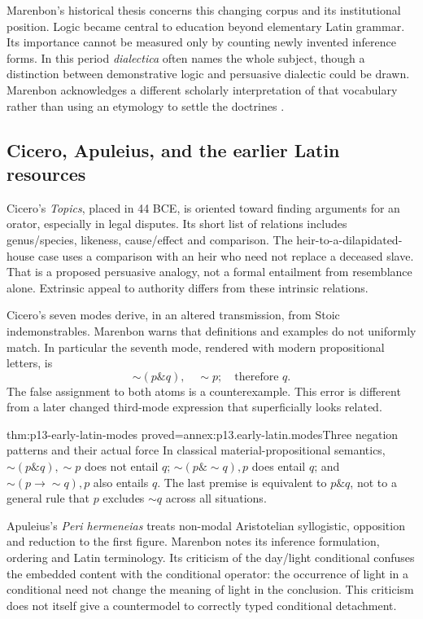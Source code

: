 Marenbon's historical thesis concerns this changing corpus and its
institutional position. Logic became central to education beyond
elementary Latin grammar. Its importance cannot be measured only
by counting newly invented inference forms. In this period
\emph{dialectica} often names the whole subject, though a distinction
between demonstrative logic and persuasive dialectic could be drawn.
Marenbon acknowledges a different scholarly interpretation of that
vocabulary rather than using an etymology to settle the doctrines
\cite[pp.~1--3]{Marenbon2007FordhamEarlyLatin}.

\subsection{Cicero, Apuleius, and the earlier Latin resources}

Cicero's \emph{Topics}, placed in 44 BCE, is oriented toward finding
arguments for an orator, especially in legal disputes. Its short list
of relations includes genus/species, likeness, cause/effect and comparison.
The heir-to-a-dilapidated-house case uses a comparison with an heir
who need not replace a deceased slave. That is a proposed persuasive
analogy, not a formal entailment from resemblance alone.
Extrinsic appeal to authority differs from these intrinsic relations.

Cicero's seven modes derive, in an altered transmission, from Stoic
indemonstrables. Marenbon warns that definitions and examples do not
uniformly match. In particular the seventh mode, rendered with modern
propositional letters, is
\[
 \sim(p\mathbin{\&}q),\quad\sim p;\quad\text{therefore }q.
\]
The false assignment to both atoms is a counterexample.
This error is different from a later changed third-mode expression
that superficially looks related.

\begin{hblemma}{thm:p13-early-latin-modes}
 {proved=annex:p13.early-latin.modes}{Three negation patterns and their actual force}
In classical material-propositional semantics,
\(\sim(p\mathbin{\&}q),\sim p\) does not entail \(q\);
\(\sim(p\mathbin{\&}\sim q),p\) does entail \(q\);
and \(\sim(p\to\sim q),p\) also entails \(q\).
The last premise is equivalent to \(p\mathbin{\&}q\), not to a general
rule that \(p\) excludes \(\sim q\) across all situations.
\end{hblemma}

Apuleius's \emph{Peri hermeneias} treats non-modal Aristotelian
syllogistic, opposition and reduction to the first figure. Marenbon
notes its inference formulation, ordering and Latin terminology.
Its criticism of the day/light conditional confuses the embedded
content with the conditional operator: the occurrence of light in
a conditional need not change the meaning of light in the conclusion.
This criticism does not itself give a countermodel to correctly typed
conditional detachment.

